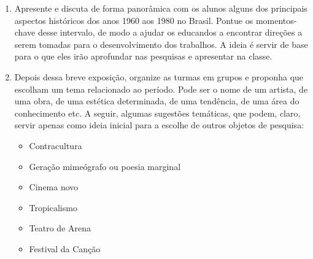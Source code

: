 \documentclass[12pt]{extarticle}
\begin{document}
\begin{enumerate} 
\item Apresente e discuta de forma panorâmica com os
alunos alguns dos principais aspectos históricos dos anos 1960 aos 1980
no Brasil. Pontue os momentos-chave desse intervalo, de modo a ajudar os
educandos a encontrar direções a serem tomadas para o desenvolvimento
dos trabalhos. A ideia é servir de base para o que eles irão aprofundar
nas pesquisas e apresentar na classe.




\item Depois dessa breve exposição, organize as turmas em grupos e proponha
que escolham um tema relacionado ao período. Pode ser o nome de um
artista, de uma obra, de uma estética determinada, de uma tendência, de
uma área do conhecimento etc. A seguir, algumas sugestões temáticas, que
podem, claro, servir apenas como ideia inicial para a escolhe de outros
objetos de pesquisa:

\begin{itemize}
\item
  Contracultura
  
  
\item
  Geração mimeógrafo ou poesia marginal
\item
  Cinema novo
  
  
\item
  Tropicalismo
\item
  Teatro de Arena
  
 
\item
  Festival da Canção
  

\end{itemize}
\end{enumerate}
\end{document}
